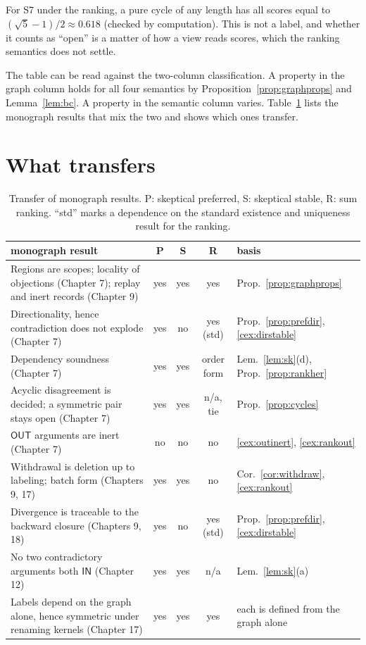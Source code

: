 \documentclass[11pt]{article}
\theoremstyle{plain}
\theoremstyle{definition}
\theoremstyle{remark}
\newcommand{\IN}{\textsf{IN}}
\newcommand{\OUT}{\textsf{OUT}}
\begin{document}
For S7 under the ranking, a pure cycle of any length has all scores equal to $(\sqrt5-1)/2\approx0.618$ (checked by computation). This is not a label, and whether it counts as ``open'' is a matter of how a view reads scores, which the ranking semantics does not settle.

The table can be read against the two-column classification. A property in the graph column holds for all four semantics by Proposition~\ref{prop:graphprops} and Lemma~\ref{lem:bc}. A property in the semantic column varies. Table~\ref{tab:transfer} lists the monograph results that mix the two and shows which ones transfer.

\section{What transfers}\label{sec:transfer}

\begin{table}[h]
\centering
\small
\begin{tabularx}{\textwidth}{@{}>{\raggedright\arraybackslash}p{} ccc>{\raggedright\arraybackslash}X@{}}
\toprule
monograph result & P & S & R & basis\\
\midrule
Regions are scopes; locality of objections (Chapter 7); replay and inert records (Chapter 9) & yes & yes & yes & Prop.~\ref{prop:graphprops}\\
Directionality, hence contradiction does not explode (Chapter 7) & yes & no & yes (std) & Prop.~\ref{prop:prefdir}, \ref{cex:dirstable}\\
Dependency soundness (Chapter 7) & yes & yes & order form & Lem.~\ref{lem:sk}(d), Prop.~\ref{prop:rankher}\\
Acyclic disagreement is decided; a symmetric pair stays open (Chapter 7) & yes & yes & n/a, tie & Prop.~\ref{prop:cycles}\\
$\OUT$ arguments are inert (Chapter 7) & no & no & no & \ref{cex:outinert}, \ref{cex:rankout}\\
Withdrawal is deletion up to labeling; batch form (Chapters 9, 17) & yes & yes & no & Cor.~\ref{cor:withdraw}, \ref{cex:rankout}\\
Divergence is traceable to the backward closure (Chapters 9, 18) & yes & no & yes (std) & Prop.~\ref{prop:prefdir}, \ref{cex:dirstable}\\
No two contradictory arguments both $\IN$ (Chapter 12) & yes & yes & n/a & Lem.~\ref{lem:sk}(a)\\
Labels depend on the graph alone, hence symmetric under renaming kernels (Chapter 17) & yes & yes & yes & each is defined from the graph alone\\
\bottomrule
\end{tabularx}
\caption{Transfer of monograph results. P: skeptical preferred, S: skeptical stable, R: sum ranking. ``std'' marks a dependence on the standard existence and uniqueness result for the ranking.}
\label{tab:transfer}
\end{table}
\end{document}
